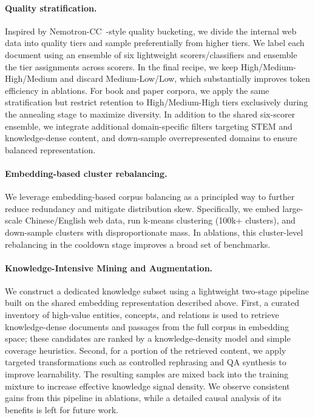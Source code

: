 \paragraph{Quality stratification.}
Inspired by Nemotron-CC~\cite{su2025nemotroncctransformingcommoncrawl}-style quality bucketing, we divide the internal web data into quality tiers and sample preferentially from higher tiers.
We label each document using an ensemble of six lightweight scorers/classifiers and ensemble the tier assignments across scorers.
In the final recipe, we keep High/Medium-High/Medium and discard Medium-Low/Low, which substantially improves token efficiency in ablations.
For book and paper corpora, we apply the same stratification but restrict retention to High/Medium-High tiers exclusively during the annealing stage to maximize diversity.
In addition to the shared six-scorer ensemble, we integrate additional domain-specific filters targeting STEM and knowledge-dense content, and down-sample overrepresented domains to ensure balanced representation.

\paragraph{Embedding-based cluster rebalancing.}
We leverage embedding-based corpus balancing as a principled way to further reduce redundancy and mitigate distribution skew.
Specifically, we embed large-scale Chinese/English web data, run k-means clustering (100k+ clusters), and down-sample clusters with disproportionate mass.
In ablations, this cluster-level rebalancing in the cooldown stage improves a broad set of benchmarks.

\paragraph{Knowledge-Intensive Mining and Augmentation.}
We construct a dedicated knowledge subset using a lightweight two-stage pipeline built on the shared embedding representation described above.
First, a curated inventory of high-value entities, concepts, and relations is used to retrieve knowledge-dense documents and passages from the full corpus in embedding space; these candidates are ranked by a knowledge-density model and simple coverage heuristics.
Second, for a portion of the retrieved content, we apply targeted transformations such as controlled rephrasing and QA synthesis to improve learnability.
The resulting samples are mixed back into the training mixture to increase effective knowledge signal density.
We observe consistent gains from this pipeline in ablations, while a detailed causal analysis of its benefits is left for future work.


